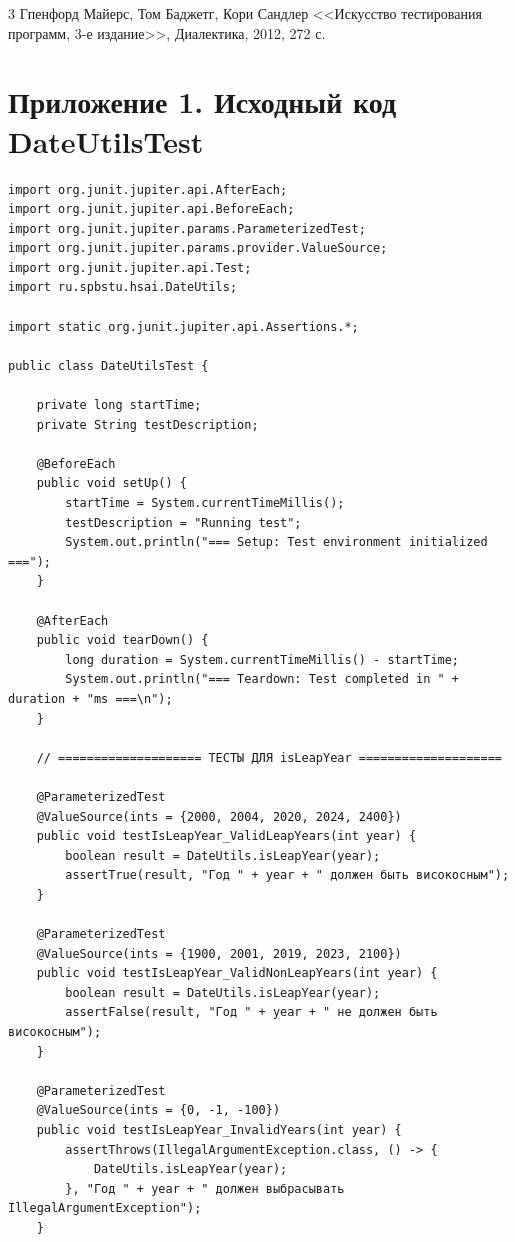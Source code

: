 \documentclass{article}[14pt]
\begin{document}
\pagebreak

\begin{thebibliography}{3}
	\bibitem{[1]} Гпенфорд Майерс, Том Баджетг, Кори Сандлер <<Искусство тестирования программ, 3-е издание>>, Диалектика, 2012, 272 с.
\end{thebibliography}

\pagebreak

\section*{Приложение 1. Исходный код DateUtilsTest}

\begin{lstlisting}
import org.junit.jupiter.api.AfterEach;
import org.junit.jupiter.api.BeforeEach;
import org.junit.jupiter.params.ParameterizedTest;
import org.junit.jupiter.params.provider.ValueSource;
import org.junit.jupiter.api.Test;
import ru.spbstu.hsai.DateUtils;

import static org.junit.jupiter.api.Assertions.*;

public class DateUtilsTest {

    private long startTime;
    private String testDescription;

    @BeforeEach
    public void setUp() {
        startTime = System.currentTimeMillis();
        testDescription = "Running test";
        System.out.println("=== Setup: Test environment initialized ===");
    }

    @AfterEach
    public void tearDown() {
        long duration = System.currentTimeMillis() - startTime;
        System.out.println("=== Teardown: Test completed in " + duration + "ms ===\n");
    }

    // ==================== ТЕСТЫ ДЛЯ isLeapYear ====================

    @ParameterizedTest
    @ValueSource(ints = {2000, 2004, 2020, 2024, 2400})
    public void testIsLeapYear_ValidLeapYears(int year) {
        boolean result = DateUtils.isLeapYear(year);
        assertTrue(result, "Год " + year + " должен быть високосным");
    }

    @ParameterizedTest
    @ValueSource(ints = {1900, 2001, 2019, 2023, 2100})
    public void testIsLeapYear_ValidNonLeapYears(int year) {
        boolean result = DateUtils.isLeapYear(year);
        assertFalse(result, "Год " + year + " не должен быть високосным");
    }

    @ParameterizedTest
    @ValueSource(ints = {0, -1, -100})
    public void testIsLeapYear_InvalidYears(int year) {
        assertThrows(IllegalArgumentException.class, () -> {
            DateUtils.isLeapYear(year);
        }, "Год " + year + " должен выбрасывать IllegalArgumentException");
    }


\end{lstlisting}
\end{document}
